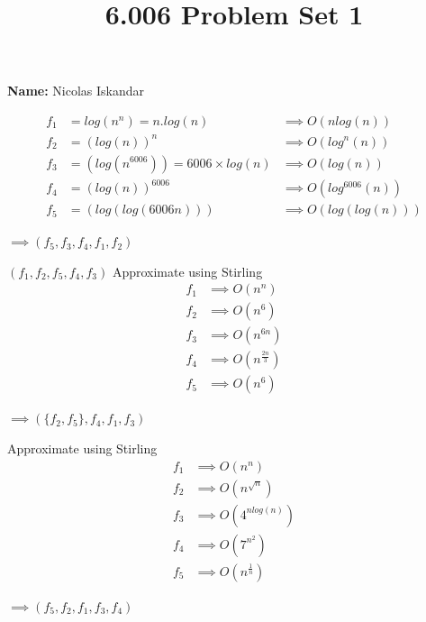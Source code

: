 \documentclass[12pt,twoside]{article}
\title{6.006 Problem Set 1}
\newcommand{\theproblemsetnum}{1}
\begin{document}
\handout{Problem Set \theproblemsetnum}

\setlength{\parindent}{0pt}
\medskip\hrulefill\medskip

{\bf Name:} Nicolas Iskandar

\medskip\hrulefill

\begin{problems}

\problem  %

\begin{problemparts}
\problempart %
\begin{align*}
  f_1 &= log(n^n) = n.log(n) &\implies O(nlog(n)) \\
  f_2 &= (log(n))^n &\implies O(log^n(n)) \\
  f_3 &= (log(n^6006)) = 6006 \times log(n) &\implies O(log(n)) \\
  f_4 &= (log(n))^6006 &\implies O(log^{6006}(n)) \\
  f_5 &= (log(log(6006n))) &\implies O(log(log(n)))
\end{align*}
\begin{center}
  $ \implies (f_5, f_3, f_4, f_1, f_2) $
\end{center}

\problempart %
$ (f_1, f_2, f_5, f_4, f_3) $
\problempart %
Approximate using Stirling
\begin{align*}
  f_1 &\implies O(n^n) \\
  f_2 &\implies O(n^6) \\
  f_3 &\implies O(n^{6n}) \\
  f_4 &\implies O(n^\frac{2n}{3}) \\
  f_5 &\implies O(n^6)
\end{align*}
\begin{center}
  $ \implies (\{f_2, f_5\}, f_4, f_1, f_3) $
\end{center}
\problempart %
Approximate using Stirling
\begin{align*}
  f_1 &\implies O(n^n) \\
  f_2 &\implies O(n^\sqrt{n}) \\
  f_3 &\implies O(4^{nlog(n)}) \\
  f_4 &\implies O(7^{n^2}) \\
  f_5 &\implies O(n^\frac{1}{n})
\end{align*}
\begin{center}
  $ \implies (f_5, f_2, f_1, f_3, f_4) $
\end{center}
\end{problemparts}


\end{problems}
\end{document}
